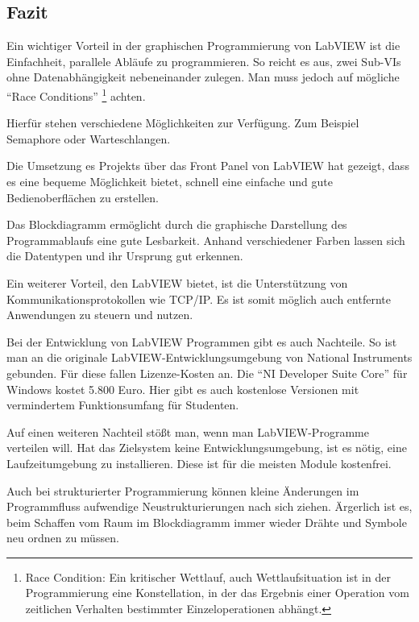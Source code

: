 \subsection{Fazit}
Ein wichtiger Vorteil in der graphischen Programmierung von LabVIEW ist die Einfachheit, parallele Abläufe zu programmieren. 
So reicht es aus, zwei Sub-VIs ohne Datenabhängigkeit nebeneinander zulegen. 
Man muss jedoch auf mögliche "`Race Conditions"'
	\footnote{Race Condition: Ein kritischer Wettlauf, auch Wettlaufsituation ist 	in der Programmierung eine Konstellation, in der das Ergebnis einer Operation vom zeitlichen Verhalten bestimmter Einzeloperationen abhängt.\cite{wiki-RC} } 
achten.



Hierfür stehen verschiedene Möglichkeiten zur Verfügung. 
Zum Beispiel Semaphore oder Warteschlangen. 

Die Umsetzung es Projekts über das Front Panel von LabVIEW hat gezeigt, dass es eine bequeme Möglichkeit bietet, schnell eine einfache und  gute Bedienoberflächen zu erstellen.


Das Blockdiagramm ermöglicht durch die graphische Darstellung des Programmablaufs eine gute Lesbarkeit.
Anhand verschiedener Farben lassen sich die Datentypen und ihr Ursprung gut erkennen.

Ein weiterer Vorteil, den LabVIEW bietet, ist die Unterstützung von Kommunikationsprotokollen wie TCP/IP. 
Es ist somit möglich auch  entfernte Anwendungen zu steuern und nutzen.

Bei der Entwicklung von LabVIEW Programmen gibt es auch Nachteile.
So ist man an die originale LabVIEW-Entwicklungsumgebung von National Instruments gebunden. Für diese fallen Lizenze-Kosten an. Die "`NI Developer Suite Core"' für Windows kostet 5.800 Euro.
Hier gibt es auch kostenlose Versionen mit vermindertem Funktionsumfang für Studenten. \cite{ni-kost}

Auf einen weiteren Nachteil stößt man, wenn man LabVIEW-Programme verteilen will. Hat das Zielsystem keine Entwicklungsumgebung, ist es nötig, eine Laufzeitumgebung zu installieren.
Diese ist für die meisten Module kostenfrei.

Auch bei strukturierter Programmierung können kleine Änderungen im Programmfluss  aufwendige Neustrukturierungen nach sich ziehen. 
Ärgerlich ist es, beim Schaffen vom Raum im Blockdiagramm immer wieder Drähte und Symbole neu ordnen zu müssen.

